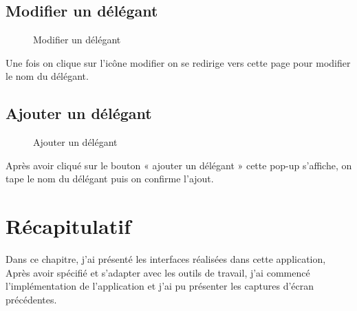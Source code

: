 \documentclass[a4paper]{report}
\begin{document}
\begin{doublespace}
	\subsection{Modifier un délégant}
	\begin{figure}[H]
		\begin{center}
			\caption{Modifier un délégant}
		\end{center}
	\end{figure}
	Une fois on clique sur l'icône modifier on se redirige vers cette page pour modifier le nom du délégant.
	\subsection{Ajouter un délégant}
	\begin{figure}[H]
		\begin{center}
			\caption{Ajouter un délégant}
		\end{center}
	\end{figure}
	Après avoir cliqué sur le bouton « ajouter un délégant » cette pop-up s'affiche, on tape le nom du délégant puis on confirme l'ajout.

	\section{Récapitulatif}

	Dans ce chapitre, j'ai présenté les interfaces réalisées dans cette application,
	Après avoir spécifié et s'adapter avec les outils de travail, j'ai commencé l'implémentation de
	l’application et j'ai pu présenter les captures d’écran précédentes.


\end{doublespace}
\end{document}
